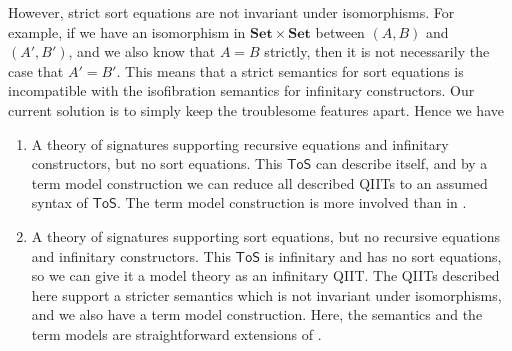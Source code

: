 \documentclass{easychair}
\newcommand{\ToS}{\mathsf{ToS}}
\begin{document}
However, strict sort equations are not invariant under isomorphisms. For
example, if we have an isomorphism in $\mathbf{Set}\times\mathbf{Set}$ between
$(A, B)$ and $(A', B')$, and we also know that $A = B$ strictly, then it is not
necessarily the case that $A' = B'$. This means that a strict semantics for sort
equations is incompatible with the isofibration semantics for infinitary
constructors. Our current solution is to simply keep the troublesome features
apart. Hence we have
\begin{enumerate}
\item A theory of signatures supporting recursive equations and infinitary
  constructors, but no sort equations. This $\ToS$ can describe itself, and by a
  term model construction we can reduce all described QIITs to an assumed syntax
  of $\ToS$. The term model construction is more involved than in
  \cite{kaposi2019constructing}.
\item A theory of signatures supporting sort equations, but no recursive
  equations and infinitary constructors. This $\ToS$ is infinitary and has no
  sort equations, so we can give it a model theory as an infinitary QIIT. The
  QIITs described here support a stricter semantics which is not invariant under
  isomorphisms, and we also have a term model construction. Here, the semantics
  and the term models are straightforward extensions of
  \cite{kaposi2019constructing}.
\end{enumerate}



\end{document}
